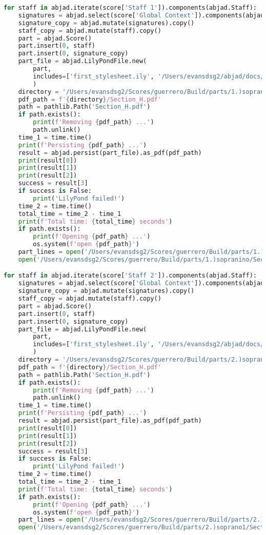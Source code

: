 \begin{lstlisting}[language=Python, caption=Invocation Source Code]
for staff in abjad.iterate(score['Staff 1']).components(abjad.Staff):
    signatures = abjad.select(score['Global Context']).components(abjad.Staff)
    signature_copy = abjad.mutate(signatures).copy()
    staff_copy = abjad.mutate(staff).copy()
    part = abjad.Score()
    part.insert(0, staff)
    part.insert(0, signature_copy)
    part_file = abjad.LilyPondFile.new(
        part,
        includes=['first_stylesheet.ily', '/Users/evansdsg2/abjad/docs/source/_stylesheets/abjad.ily'],
        )
    directory = '/Users/evansdsg2/Scores/guerrero/Build/parts/1.)sopranino'
    pdf_path = f'{directory}/Section_H.pdf'
    path = pathlib.Path('Section_H.pdf')
    if path.exists():
        print(f'Removing {pdf_path} ...')
        path.unlink()
    time_1 = time.time()
    print(f'Persisting {pdf_path} ...')
    result = abjad.persist(part_file).as_pdf(pdf_path)
    print(result[0])
    print(result[1])
    print(result[2])
    success = result[3]
    if success is False:
        print('LilyPond failed!')
    time_2 = time.time()
    total_time = time_2 - time_1
    print(f'Total time: {total_time} seconds')
    if path.exists():
        print(f'Opening {pdf_path} ...')
        os.system(f'open {pdf_path}')
    part_lines = open('/Users/evansdsg2/Scores/guerrero/Build/parts/1.)sopranino/Section_H.ly').readlines()
    open('/Users/evansdsg2/Scores/guerrero/Build/parts/1.)sopranino/Section_H.ly', 'w').writelines(part_lines[15:-1])

for staff in abjad.iterate(score['Staff 2']).components(abjad.Staff):
    signatures = abjad.select(score['Global Context']).components(abjad.Staff)
    signature_copy = abjad.mutate(signatures).copy()
    staff_copy = abjad.mutate(staff).copy()
    part = abjad.Score()
    part.insert(0, staff)
    part.insert(0, signature_copy)
    part_file = abjad.LilyPondFile.new(
        part,
        includes=['first_stylesheet.ily', '/Users/evansdsg2/abjad/docs/source/_stylesheets/abjad.ily'],
        )
    directory = '/Users/evansdsg2/Scores/guerrero/Build/parts/2.)soprano1'
    pdf_path = f'{directory}/Section_H.pdf'
    path = pathlib.Path('Section_H.pdf')
    if path.exists():
        print(f'Removing {pdf_path} ...')
        path.unlink()
    time_1 = time.time()
    print(f'Persisting {pdf_path} ...')
    result = abjad.persist(part_file).as_pdf(pdf_path)
    print(result[0])
    print(result[1])
    print(result[2])
    success = result[3]
    if success is False:
        print('LilyPond failed!')
    time_2 = time.time()
    total_time = time_2 - time_1
    print(f'Total time: {total_time} seconds')
    if path.exists():
        print(f'Opening {pdf_path} ...')
        os.system(f'open {pdf_path}')
    part_lines = open('/Users/evansdsg2/Scores/guerrero/Build/parts/2.)soprano1/Section_H.ly').readlines()
    open('/Users/evansdsg2/Scores/guerrero/Build/parts/2.)soprano1/Section_H.ly', 'w').writelines(part_lines[15:-1])


\end{lstlisting}
